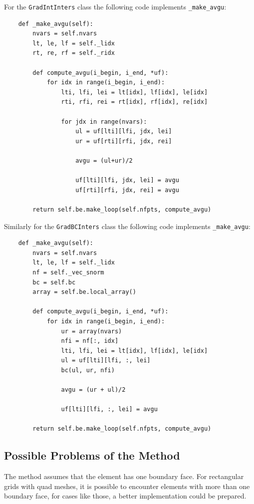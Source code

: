 \documentclass[a4paper, 12pt]{article}
\begin{document}
For the \verb|GradIntInters| class the following code implements \verb|_make_avgu|:

\begin{verbatim}
    def _make_avgu(self):
        nvars = self.nvars
        lt, le, lf = self._lidx
        rt, re, rf = self._ridx

        def compute_avgu(i_begin, i_end, *uf):
            for idx in range(i_begin, i_end):
                lti, lfi, lei = lt[idx], lf[idx], le[idx]
                rti, rfi, rei = rt[idx], rf[idx], re[idx]

                for jdx in range(nvars):
                    ul = uf[lti][lfi, jdx, lei]
                    ur = uf[rti][rfi, jdx, rei]

                    avgu = (ul+ur)/2

                    uf[lti][lfi, jdx, lei] = avgu
                    uf[rti][rfi, jdx, rei] = avgu

        return self.be.make_loop(self.nfpts, compute_avgu)
\end{verbatim}
\par

Similarly for the \verb|GradBCInters| class the following code implements \verb|_make_avgu|:

\begin{verbatim}
    def _make_avgu(self):
        nvars = self.nvars
        lt, le, lf = self._lidx
        nf = self._vec_snorm
        bc = self.bc
        array = self.be.local_array()

        def compute_avgu(i_begin, i_end, *uf):
            for idx in range(i_begin, i_end):
                ur = array(nvars)
                nfi = nf[:, idx]
                lti, lfi, lei = lt[idx], lf[idx], le[idx]
                ul = uf[lti][lfi, :, lei]
                bc(ul, ur, nfi)

                avgu = (ur + ul)/2

                uf[lti][lfi, :, lei] = avgu

        return self.be.make_loop(self.nfpts, compute_avgu)
\end{verbatim}
\par
\subsection{Possible Problems of the Method} \label{probavgudelu}
The method assumes that the element has one boundary face. For rectangular grids with quad meshes, it is possible to encounter elements with more than one boundary face, for cases like those, a better implementation could be prepared.
\end{document}
